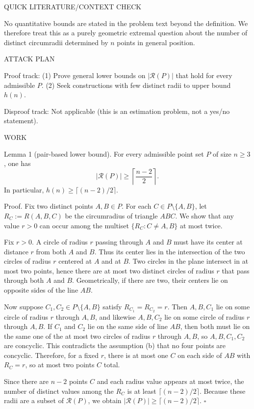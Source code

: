 QUICK LITERATURE/CONTEXT CHECK

No quantitative bounds are stated in the problem text beyond the definition.
We therefore treat this as a purely geometric extremal question about the number of distinct circumradii determined by $n$ points in general position.

ATTACK PLAN

Proof track:
(1) Prove general lower bounds on $|\mathcal{R}(P)|$ that hold for every admissible $P$.
(2) Seek constructions with few distinct radii to upper bound $h(n)$.

Disproof track:
Not applicable (this is an estimation problem, not a yes/no statement).

WORK

Lemma 1 (pair-based lower bound).
For every admissible point set $P$ of size $n\ge 3$, one has
\[
|\mathcal{R}(P)|\ge \left\lceil\frac{n-2}{2}\right\rceil.
\]
In particular, $h(n)\ge \lceil (n-2)/2\rceil$.

Proof.
Fix two distinct points $A,B\in P$.
For each $C\in P\setminus\{A,B\}$, let $R_C:=R(A,B,C)$ be the circumradius of triangle $ABC$.
We show that any value $r>0$ can occur among the multiset $\{R_C: C\ne A,B\}$ at most twice.

Fix $r>0$.
A circle of radius $r$ passing through $A$ and $B$ must have its center at distance $r$ from both $A$ and $B$.
Thus its center lies in the intersection of the two circles of radius $r$ centered at $A$ and at $B$.
Two circles in the plane intersect in at most two points, hence there are at most two distinct circles of radius $r$ that pass through both $A$ and $B$.
Geometrically, if there are two, their centers lie on opposite sides of the line $AB$.

Now suppose $C_1,C_2\in P\setminus\{A,B\}$ satisfy $R_{C_1}=R_{C_2}=r$.
Then $A,B,C_1$ lie on some circle of radius $r$ through $A,B$, and likewise $A,B,C_2$ lie on some circle of radius $r$ through $A,B$.
If $C_1$ and $C_2$ lie on the same side of line $AB$, then both must lie on the same one of the at most two circles of radius $r$ through $A,B$, so $A,B,C_1,C_2$ are concyclic.
This contradicts the assumption (b) that no four points are concyclic.
Therefore, for a fixed $r$, there is at most one $C$ on each side of $AB$ with $R_C=r$, so at most two points $C$ total.

Since there are $n-2$ points $C$ and each radius value appears at most twice, the number of distinct values among the $R_C$ is at least $\lceil (n-2)/2\rceil$.
Because these radii are a subset of $\mathcal{R}(P)$, we obtain $|\mathcal{R}(P)|\ge \lceil (n-2)/2\rceil$.
$\square$

